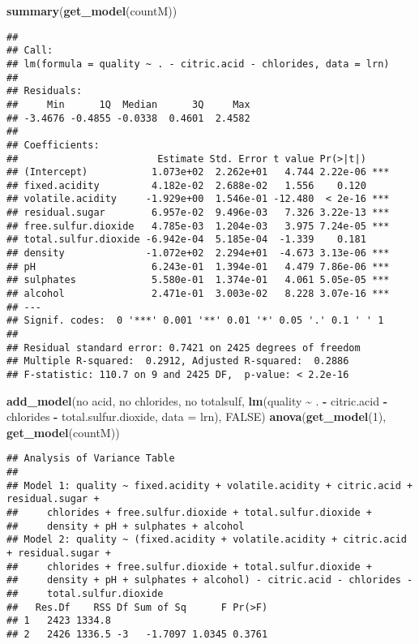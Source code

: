 \documentclass[
]{article}
\newenvironment{Shaded}{\begin{snugshade}}{\end{snugshade}}
\newcommand{\AttributeTok}[1]{\textcolor[rgb]{0.13,0.29,0.53}{#1}}
\newcommand{\ConstantTok}[1]{\textcolor[rgb]{0.56,0.35,0.01}{#1}}
\newcommand{\DecValTok}[1]{\textcolor[rgb]{0.00,0.00,0.81}{#1}}
\newcommand{\FunctionTok}[1]{\textcolor[rgb]{0.13,0.29,0.53}{\textbf{#1}}}
\newcommand{\NormalTok}[1]{#1}
\newcommand{\SpecialCharTok}[1]{\textcolor[rgb]{0.81,0.36,0.00}{\textbf{#1}}}
\newcommand{\StringTok}[1]{\textcolor[rgb]{0.31,0.60,0.02}{#1}}
\begin{document}
\begin{Shaded}
\begin{Highlighting}[]
\FunctionTok{summary}\NormalTok{(}\FunctionTok{get\_model}\NormalTok{(countM))}
\end{Highlighting}
\end{Shaded}

\begin{verbatim}
## 
## Call:
## lm(formula = quality ~ . - citric.acid - chlorides, data = lrn)
## 
## Residuals:
##     Min      1Q  Median      3Q     Max 
## -3.4676 -0.4855 -0.0338  0.4601  2.4582 
## 
## Coefficients:
##                        Estimate Std. Error t value Pr(>|t|)    
## (Intercept)           1.073e+02  2.262e+01   4.744 2.22e-06 ***
## fixed.acidity         4.182e-02  2.688e-02   1.556    0.120    
## volatile.acidity     -1.929e+00  1.546e-01 -12.480  < 2e-16 ***
## residual.sugar        6.957e-02  9.496e-03   7.326 3.22e-13 ***
## free.sulfur.dioxide   4.785e-03  1.204e-03   3.975 7.24e-05 ***
## total.sulfur.dioxide -6.942e-04  5.185e-04  -1.339    0.181    
## density              -1.072e+02  2.294e+01  -4.673 3.13e-06 ***
## pH                    6.243e-01  1.394e-01   4.479 7.86e-06 ***
## sulphates             5.580e-01  1.374e-01   4.061 5.05e-05 ***
## alcohol               2.471e-01  3.003e-02   8.228 3.07e-16 ***
## ---
## Signif. codes:  0 '***' 0.001 '**' 0.01 '*' 0.05 '.' 0.1 ' ' 1
## 
## Residual standard error: 0.7421 on 2425 degrees of freedom
## Multiple R-squared:  0.2912, Adjusted R-squared:  0.2886 
## F-statistic: 110.7 on 9 and 2425 DF,  p-value: < 2.2e-16
\end{verbatim}

\begin{Shaded}
\begin{Highlighting}[]
\FunctionTok{add\_model}\NormalTok{(}\StringTok{\textquotesingle{}no acid, no chlorides, no totalsulf\textquotesingle{}}\NormalTok{, }\FunctionTok{lm}\NormalTok{(quality }\SpecialCharTok{\textasciitilde{}}\NormalTok{ . }\SpecialCharTok{{-}}\NormalTok{ citric.acid }\SpecialCharTok{{-}}\NormalTok{ chlorides }\SpecialCharTok{{-}}\NormalTok{ total.sulfur.dioxide, }\AttributeTok{data =}\NormalTok{ lrn), }\ConstantTok{FALSE}\NormalTok{)}
\FunctionTok{anova}\NormalTok{(}\FunctionTok{get\_model}\NormalTok{(}\DecValTok{1}\NormalTok{), }\FunctionTok{get\_model}\NormalTok{(countM))}
\end{Highlighting}
\end{Shaded}

\begin{verbatim}
## Analysis of Variance Table
## 
## Model 1: quality ~ fixed.acidity + volatile.acidity + citric.acid + residual.sugar + 
##     chlorides + free.sulfur.dioxide + total.sulfur.dioxide + 
##     density + pH + sulphates + alcohol
## Model 2: quality ~ (fixed.acidity + volatile.acidity + citric.acid + residual.sugar + 
##     chlorides + free.sulfur.dioxide + total.sulfur.dioxide + 
##     density + pH + sulphates + alcohol) - citric.acid - chlorides - 
##     total.sulfur.dioxide
##   Res.Df    RSS Df Sum of Sq      F Pr(>F)
## 1   2423 1334.8                           
## 2   2426 1336.5 -3   -1.7097 1.0345 0.3761
\end{verbatim}
\end{document}
